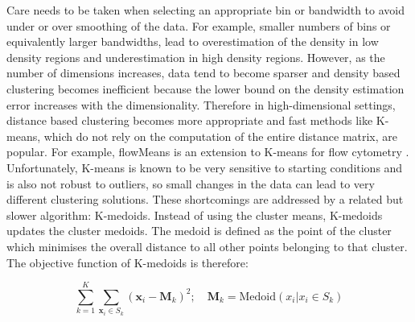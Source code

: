 Care needs to be taken when selecting an appropriate bin or bandwidth to avoid under or over smoothing of the data.
For example, smaller numbers of bins or equivalently larger bandwidths, lead to overestimation of the density in low density regions and underestimation in high density regions.
However, as the number of dimensions increases, data tend to become sparser
and density based clustering becomes inefficient because the lower bound on the density estimation error increases with the dimensionality.
Therefore in high-dimensional settings, distance based clustering becomes more appropriate and
fast methods like K-means, which do not rely on the computation of the entire distance matrix, are popular.
For example, flowMeans is an extension to K-means for flow cytometry \citep{Aghaeepour:2010fv}.
Unfortunately, K-means is known to be very sensitive to starting conditions and is also not robust to outliers,
so small changes in the data can lead to very different clustering solutions.
These shortcomings are addressed by a related but slower algorithm: K-medoids.
Instead of using the cluster means, K-medoids updates the cluster medoids.
The medoid is defined as the point of the cluster which minimises the overall distance
to all other points belonging to that cluster.
The objective function of K-medoids is therefore:

\[
    \sum_{k=1}^{K} \sum_{\mathbf x_i \in S_k} ( \mathbf x_i - \boldsymbol M_k )^2 ; \quad \boldsymbol M_k=\text{Medoid}(x_i| x_i \in S_k)
\]


